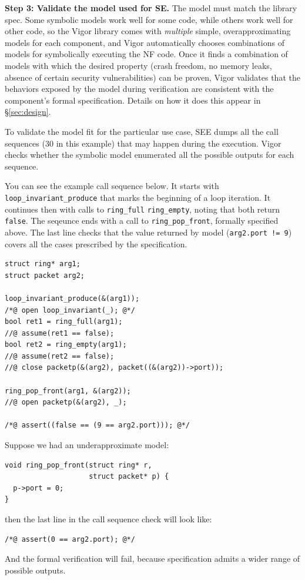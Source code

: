 \documentclass[letterpaper,twocolumn,10pt]{article}
\newcommand{\code}[1]{\lstinline{#1}}
\begin{document}
{\bf Step 3: Validate the model used for SE.}
The model must match the library spec. Some symbolic models work well for some code, while others work well for other code, so the Vigor library comes with {\em multiple} simple, overapproximating models for each component, and Vigor automatically chooses combinations of models for symbolically executing the NF code. Once it finds a combination of models with which the desired property (crash freedom, no memory leaks, absence of certain security vulnerabilities) can be proven, Vigor validates that the behaviors exposed by the model during verification are consistent with the component's formal specification.  Details on how it does this appear in \S\ref{sec:design}.

To validate the model fit for the particular use case, SEE dumps
all the call sequences (30 in this example) that may happen during the execution.
Vigor checks whether the symbolic model enumerated all the possible
outputs for each sequence.

You can see the example call sequence below. It starts with
\code{loop_invariant_produce} that marks the beginning of a loop iteration. It
continues then with calls to \code{ring_full} \code{ring_empty}, noting that
both return \code{false}. The seqeunce ends with a call to
\code{ring_pop_front}, formally specified above. The last line checks that the
value returned by model (\code{arg2.port != 9}) covers all the cases prescribed
by the specification.
 
\begin{lstlisting}
struct ring* arg1;
struct packet arg2;

loop_invariant_produce(&(arg1));
/*@ open loop_invariant(_); @*/
bool ret1 = ring_full(arg1);
//@ assume(ret1 == false);
bool ret2 = ring_empty(arg1);
//@ assume(ret2 == false);
//@ close packetp(&(arg2), packet((&(arg2))->port));

ring_pop_front(arg1, &(arg2));
//@ open packetp(&(arg2), _);

/*@ assert((false == (9 == arg2.port))); @*/
\end{lstlisting}

Suppose we had an underapproximate model:
\begin{lstlisting}
void ring_pop_front(struct ring* r,
                    struct packet* p) {
  p->port = 0;
}
\end{lstlisting}
then the last line in the call sequence check will look like:
\begin{lstlisting}
/*@ assert(0 == arg2.port); @*/
\end{lstlisting}
And the formal verification will fail, because specification admits a wider
range of possible outputs.
\end{document}
